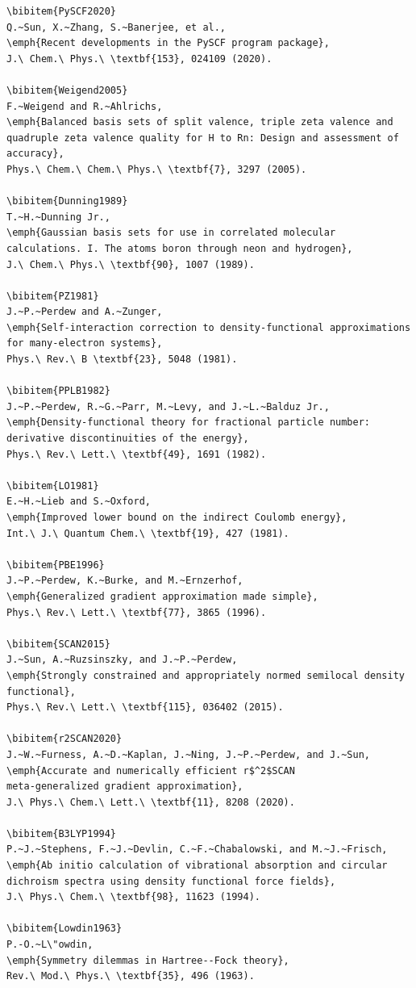 \documentclass[11pt]{report}
\theoremstyle{definition}
\theoremstyle{remark}
\begin{document}
\begin{verbatim}
\bibitem{PySCF2020}
Q.~Sun, X.~Zhang, S.~Banerjee, et al.,
\emph{Recent developments in the PySCF program package},
J.\ Chem.\ Phys.\ \textbf{153}, 024109 (2020).

\bibitem{Weigend2005}
F.~Weigend and R.~Ahlrichs,
\emph{Balanced basis sets of split valence, triple zeta valence and quadruple zeta valence quality for H to Rn: Design and assessment of accuracy},
Phys.\ Chem.\ Chem.\ Phys.\ \textbf{7}, 3297 (2005).

\bibitem{Dunning1989}
T.~H.~Dunning Jr.,
\emph{Gaussian basis sets for use in correlated molecular calculations. I. The atoms boron through neon and hydrogen},
J.\ Chem.\ Phys.\ \textbf{90}, 1007 (1989).

\bibitem{PZ1981}
J.~P.~Perdew and A.~Zunger,
\emph{Self-interaction correction to density-functional approximations
for many-electron systems},
Phys.\ Rev.\ B \textbf{23}, 5048 (1981).

\bibitem{PPLB1982}
J.~P.~Perdew, R.~G.~Parr, M.~Levy, and J.~L.~Balduz Jr.,
\emph{Density-functional theory for fractional particle number:
derivative discontinuities of the energy},
Phys.\ Rev.\ Lett.\ \textbf{49}, 1691 (1982).

\bibitem{LO1981}
E.~H.~Lieb and S.~Oxford,
\emph{Improved lower bound on the indirect Coulomb energy},
Int.\ J.\ Quantum Chem.\ \textbf{19}, 427 (1981).

\bibitem{PBE1996}
J.~P.~Perdew, K.~Burke, and M.~Ernzerhof,
\emph{Generalized gradient approximation made simple},
Phys.\ Rev.\ Lett.\ \textbf{77}, 3865 (1996).

\bibitem{SCAN2015}
J.~Sun, A.~Ruzsinszky, and J.~P.~Perdew,
\emph{Strongly constrained and appropriately normed semilocal density
functional},
Phys.\ Rev.\ Lett.\ \textbf{115}, 036402 (2015).

\bibitem{r2SCAN2020}
J.~W.~Furness, A.~D.~Kaplan, J.~Ning, J.~P.~Perdew, and J.~Sun,
\emph{Accurate and numerically efficient r$^2$SCAN
meta-generalized gradient approximation},
J.\ Phys.\ Chem.\ Lett.\ \textbf{11}, 8208 (2020).

\bibitem{B3LYP1994}
P.~J.~Stephens, F.~J.~Devlin, C.~F.~Chabalowski, and M.~J.~Frisch,
\emph{Ab initio calculation of vibrational absorption and circular
dichroism spectra using density functional force fields},
J.\ Phys.\ Chem.\ \textbf{98}, 11623 (1994).

\bibitem{Lowdin1963}
P.-O.~L\"owdin,
\emph{Symmetry dilemmas in Hartree--Fock theory},
Rev.\ Mod.\ Phys.\ \textbf{35}, 496 (1963).


\end{verbatim}
\end{document}
